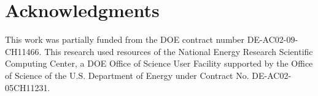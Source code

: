 \documentclass[12pt]{siamart}
\begin{document}
\section{Acknowledgments}

 This work was partially funded from the DOE contract number
DE-AC02-09-CH11466.  This research used resources of the National
Energy Research Scientific Computing Center, a DOE Office of Science
User Facility supported by the Office of Science of the
U.S. Department of Energy under Contract No. DE-AC02-05CH11231.



\end{document}
